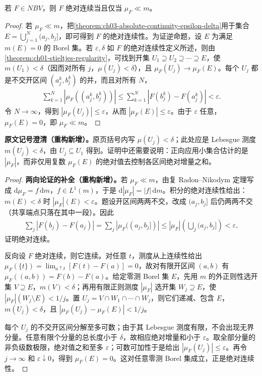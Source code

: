 \documentclass[../../main.tex]{subfiles}%
\begin{document}
\begin{proposition}\label{proposition:ch03-ac-measure-equivalence}
若 $F\in NBV$，则 $F$ 绝对连续当且仅当 $\mu_F\ll m$。
\end{proposition}
\begin{proof}
若 $\mu_F\ll m$，把\cref{theorem:ch03-absolute-continuity-epsilon-delta}用于集合 $E=\bigcup_{j=1}^N(a_j,b_j]$，即可得到 $F$ 的绝对连续性。为证逆命题，设 $E$ 为满足 $m(E)=0$ 的 Borel 集。若 $\varepsilon,\delta$ 如 $F$ 的绝对连续性定义所述，则由\cref{theorem:ch01-stieltjes-regularity}，可找到开集 $U_1\supseteq U_2\supseteq\cdots\supseteq E$，使 $m(U_1)<\delta$（因而对所有 $j$，$\mu(U_j)<\delta$），且 $\mu_F(U_j)\to\mu_F(E)$。每个 $U_j$ 都是不交开区间 $(a_j^k,b_j^k)$ 的并，而且对所有 $N$，
\begin{align*}
\sum_{k=1}^N|\mu_F((a_j^k,b_j^k))|
\le\sum_{k=1}^N|F(b_j^k)-F(a_j^k)|<\varepsilon.
\end{align*}
令 $N\to\infty$，得到 $|\mu_F(U_j)|\le\varepsilon$，从而 $|\mu_F(E)|\le\varepsilon$。由于 $\varepsilon$ 任意，$\mu_F(E)=0$，即 $\mu_F\ll m$。
\end{proof}
\begin{remark}
\textbf{原文记号澄清（重构新增）。}原页括号内写 $\mu(U_j)<\delta$；此处应是 Lebesgue 测度 $m(U_j)<\delta$，由 $U_j\subseteq U_1$ 得到。证明中还需要说明：正向应用小集合估计的是 $|\mu_F|$，而非仅用复数 $\mu_F(E)$ 的绝对值去控制各区间绝对增量之和。
\end{remark}
\begin{proof}
\textbf{两向论证的补全（重构新增）。}若 $\mu_F\ll m$，由复 Radon–Nikodym 定理写成 $\mathrm d\mu_F=f\,\mathrm dm$，$f\in L^1(m)$，于是 $\mathrm d|\mu_F|=|f|\,\mathrm dm$。积分的绝对连续性给出：$m(E)<\delta$ 时 $|\mu_F|(E)<\varepsilon$。题设开区间两两不交，改成 $(a_j,b_j]$ 后仍两两不交（共享端点只落在其中一段）。因此
\begin{align*}
\sum_j|F(b_j)-F(a_j)|
=\sum_j|\mu_F((a_j,b_j])|
\le |\mu_F|\left(\bigcup_j(a_j,b_j]\right)<\varepsilon,
\end{align*}
证明绝对连续。

反向设 $F$ 绝对连续，则它连续。对任意 $t$，测度从上连续性给出
$\mu_F(\{t\})=\lim_{a\uparrow t}[F(t)-F(a)]=0$，故对有限开区间 $(a,b)$ 有 $\mu_F((a,b))=F(b)-F(a)$。给定零测 Borel 集 $E$，先用 $m$ 的外正则性选开集 $V\supseteq E$，$m(V)<\delta$；再用有限正则测度 $|\mu_F|$ 选开集 $W_j\supseteq E$，使 $|\mu_F|(W_j\setminus E)<1/j$。置 $U_j=V\cap W_1\cap\cdots\cap W_j$，则它们递减、包含 $E$，$m(U_j)<\delta$，且 $|\mu_F(U_j)-\mu_F(E)|<1/j$。

每个 $U_j$ 的不交开区间分解至多可数；由于其 Lebesgue 测度有限，不会出现无界分量。任意有限个分量的总长度小于 $\delta$，故相应绝对增量和小于 $\varepsilon$。取全部分量的非负级数极限，绝对值之和至多 $\varepsilon$；可数可加性于是给出 $|\mu_F(U_j)|\le\varepsilon$。再令 $j\to\infty$ 和 $\varepsilon\downarrow0$，得到 $\mu_F(E)=0$。这对任意零测 Borel 集成立，正是绝对连续性。
\end{proof}
\end{document}
